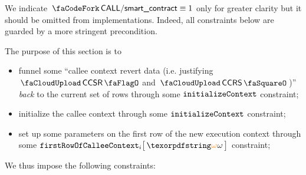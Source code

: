 \begin{center}
\end{center}
We indicate $\scenCallSmc \equiv 1$ only for greater clarity but it should be omitted from implementations.
Indeed, all constraints below are guarded by a more stringent precondition. 

The purpose of this section is to
\begin{itemize}
	\item funnel some ``callee context revert data (i.e. justifying $\miscChildSelfReverts$ and $\miscChildRevertStamp$)'' \emph{back} to the current set of rows through some $\texttt{initializeContext}$ constraint;
	\item initialize the callee context through some $\texttt{initializeContext}$ constraint;
	\item set up some parameters on the first row of the new execution context through some $\firstRowOfCallee {i}{\relof}$ constraint;
\end{itemize}
We thus impose the following constraints:
